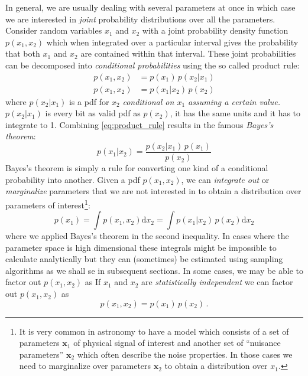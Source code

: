 \documentclass[12pt]{report}
\begin{document}
In general, we are usually dealing with several parameters at once in which
case we are interested in \emph{joint} probability distributions over all the
parameters. Consider random variables $x_1$ and $x_2$ with a joint probability
density function $p(x_1,x_2)$ which when integrated over a particular interval
gives the probability that both $x_1$ and $x_2$ are contained within that
interval. These joint probabilities can be decomposed into \emph{conditional
    probabilities} using the so called product rule:
\begin{align}
    p(x_1,x_2) & =p(x_1)\,p(x_2\lvert x_1) \\
    p(x_1,x_2) & =p(x_1\lvert x_2)\,p(x_2)
    \label{eq:product_rule}
\end{align}
where $p(x_2\lvert x_1)$ is a pdf for $x_2$ \emph{conditional on
    $x_1$ assuming a certain value.} $p(x_2\lvert x_1)$ is every bit as
valid pdf as $p(x_2)$, it has the same units and it has to integrate to 1.
Combining \ref{eq:product_rule} results in the famous \emph{Bayes's theorem}:
\begin{equation}
    p(x_1\lvert x_2)= \frac{p(x_2\lvert x_1)\,p(x_1)}{p(x_2)}
    \label{eq:bayes_theorem}
\end{equation}
Bayes's theorem is simply a rule for converting one kind of a conditional probability
into another.
Given a pdf $p(x_1,x_2)$, we can \emph{integrate out} or
\emph{marginalize} parameters that we are not interested in to obtain a distribution over
parameters of interest\footnote{
    It is very common in astronomy to have a model
    which consists of a set of parameters $\boldsymbol x_1$ of physical signal of interest and another set
    of ``nuisance parameters'' $\boldsymbol x_2$ which often describe the noise properties. In those cases
    we need to marginalize over parameters $\boldsymbol x_2$ to obtain a distribution over $x_1$.}:
\begin{equation}
    p(x_1)=\int p(x_1,x_2)\textrm{d}x_2=\int p(x_1\lvert
    x_2)\,p(x_2)\textrm{d}x_2
\end{equation}
where we applied Bayes's theorem in the second inequality.
In cases where the parameter space is high dimensional these integrals might be
impossible to calculate analytically but they can (sometimes) be estimated using sampling
algorithms as we shall se in subsequent sections.
In some cases, we may be able to factor out $p(x_1,x_2)$ as
If $x_1$ and $x_2$ are \emph{statistically independent} we can factor out $p(x_1,x_2)$ as
\begin{equation}
    p(x_1,x_2)=p(x_1)\,p(x_2)\,.
\end{equation}
\end{document}
